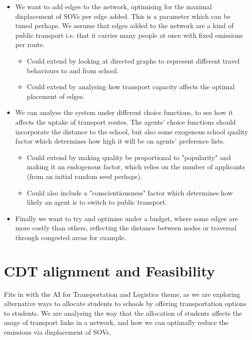 \documentclass{article}
\begin{document}
\begin{itemize}
    \item We want to add edges to the network, optimising for the maximal displacement of SOVs per edge added. This is a parameter which can be tuned perhaps. We assume that edges added to the network are a kind of public transport i.e. that it carries many people at once with fixed emissions per route.
    \begin{itemize}
        \item Could extend by looking at directed graphs to represent different travel behaviours to and from school.
        \item Could extend by analysing how transport capacity affects the optimal placement of edges. 
    \end{itemize}
    \item We can analyse the system under different choice functions, to see how it affects the uptake of transport routes. The agents' choice functions should incorporate the distance to the school, but also some exogenous school quality factor which determines how high it will be on agents' preference lists.
    \begin{itemize}
        \item Could extend by making quality be proportional to "popularity" and making it an endogenous factor, which relies on the number of applicants (from an initial random seed perhaps).
        \item Could also include a "conscientiousness" factor which determines how likely an agent is to switch to public transport.
    \end{itemize}
    \item Finally we want to try and optimise under a budget, where some edges are more costly than others, reflecting the distance between nodes or traversal through congested areas for example.
\end{itemize}

\section{CDT alignment and Feasibility}
Fits in with the AI for Transportation and Logistics theme, as we are exploring alternative ways to allocate students to schools by offering transportation options to students. We are analysing the way that the allocation of students affects the usage of transport links in a network, and how we can optimally reduce the emissions via displacement of SOVs.
\end{document}
